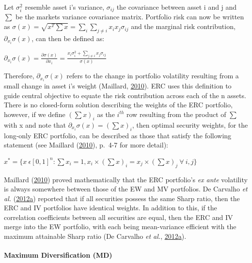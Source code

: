 \documentclass[11pt,preprint, authoryear]{elsarticle}
\numberwithin{equation}{section}
\numberwithin{figure}{section}
\numberwithin{table}{section}
\begin{document}
Let \(\sigma_i^2\) resemble asset i's variance, \(\sigma_{ij}\) the
covariance between asset i and j and \(\sum\) be the markets variance
covariance matrix. Portfolio risk can now be written as
\(\sigma(x)=\sqrt{x^T\sum x}=\sum_i\sum_{j\neq i}x_ix_j\sigma_{ij}\) and
the marginal risk contribution, \(\partial_{x_i}\sigma(x)\), can then be
defined as:

\begin{center}
$\partial_{x_i}\sigma(x)=\frac{\partial\sigma(x)}{\partial x_i}=\frac{x_i\sigma_i^2+\sum_{j\neq i}x_j\sigma_{ij}}{\sigma(x)}$ 
\end{center}

Therefore, \(\partial_{x_i}\sigma(x)\) refers to the change in portfolio
volatility resulting from a small change in asset i's weight (Maillard,
\protect\hyperlink{ref-maillard2010}{2010}). ERC uses this definition to
guide central objective to equate the risk contribution across each of
the n assets. There is no closed-form solution describing the weights of
the ERC portfolio, however, if we define \((\sum x)_i\) as the
\(i^{th}\) row resulting from the product of \(\sum\) with x and note
that \(\partial_{x_i}\sigma(x)=(\sum x)_i\), then optimal security
weights, for the long-only ERC portfolio, can be described as those that
satisfy the following statement (see Maillard
(\protect\hyperlink{ref-maillard2010}{2010}), p.~4-7 for more detail):

\begin{center}
$x^*=\{x \ \epsilon[0,1]^n:\sum x_i=1, x_i \times (\sum x)_i=x_j \times (\sum x)_j \ \forall  \ i,j \}$ 
\end{center}

Maillard (\protect\hyperlink{ref-maillard2010}{2010}) proved
mathematically that the ERC portfolio's \emph{ex ante} volatility is
always somewhere between those of the EW and MV portfolios. De Carvalho
\emph{et al.}
(\protect\hyperlink{ref-leote}{2012}\protect\hyperlink{ref-leote}{a})
reported that if all securities possess the same Sharp ratio, then the
ERC and IV portfolios have identical weights. In addition to this, if
the correlation coefficients between all securities are equal, then the
ERC and IV merge into the EW portfolio, with each being mean-variance
efficient with the maximum attainable Sharp ratio (De Carvalho \emph{et
al.},
\protect\hyperlink{ref-leote}{2012}\protect\hyperlink{ref-leote}{a}).

\hypertarget{maximum-diversification-md}{%
\paragraph{Maximum Diversification
(MD)}\label{maximum-diversification-md}}
\end{document}
